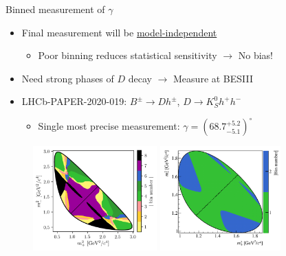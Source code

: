 \documentclass{beamer}
\begin{document}
\begin{frame}{Binned measurement of $\gamma$}
  \begin{itemize}
    \setlength\itemsep{0.5em}
    \item{Final measurement will be \underline{model-independent}}
    \begin{itemize}
      \item{Poor binning reduces statistical sensitivity $\to$ No bias!}
    \end{itemize}
    \item{Need strong phases of $D$ decay $\to$ Measure at BESIII}
    \item{LHCb-PAPER-2020-019: $B^\pm\to Dh^\pm$, $D\to K_S^0 h^+h^-$}
    \begin{itemize}
      \item{Single most precise measurement: $\gamma = (68.7^{+5.2}_{-5.1})^\circ$}
    \end{itemize}
  \end{itemize}
  \begin{figure}
    \includegraphics[height = 4cm]{Plots/KsPiPi_optimal.png}
    \includegraphics[height = 4cm]{Plots/KsKK_binning.png}
  \end{figure}
\end{frame}
\end{document}
